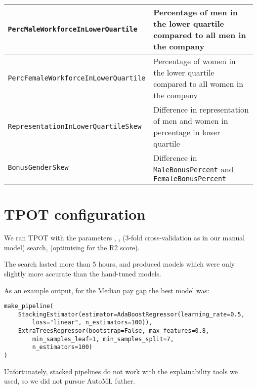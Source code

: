 \begin{centering}
{\begin{tabular}{|l|p{9cm}|}
        \texttt{PercMaleWorkforceInLowerQuartile} & Percentage of men in the lower quartile compared to all men in the company\\ \hline
        \texttt{PercFemaleWorkforceInLowerQuartile} & Percentage of women in the lower quartile compared to all women in the company\\ \hline
        \texttt{RepresentationInLowerQuartileSkew} & Difference in representation of men and women in percentage in lower quartile\\ \hline
        
        \texttt{BonusGenderSkew} & Difference in \texttt{MaleBonusPercent} and \texttt{FemaleBonusPercent} \\ \hline
        
    \end{tabular} 
    }

\end{centering}



\section{TPOT configuration}
\label{tpot-config}

We ran TPOT with the parameters 
,
, 
 (3-fold cross-validation as in our manual model)
search,
 (optimising for the R2 score).

The search lasted more than 5 hours, and produced models which were only slightly more accurate than the hand-tuned models.

As an example output, for the Median pay gap the best model was:

\begin{scriptsize}
\begin{verbatim}
make_pipeline(
    StackingEstimator(estimator=AdaBoostRegressor(learning_rate=0.5,
        loss="linear", n_estimators=100)),
    ExtraTreesRegressor(bootstrap=False, max_features=0.8, 
        min_samples_leaf=1, min_samples_split=7, 
        n_estimators=100)
)
\end{verbatim}
\end{scriptsize}

Unfortunately, stacked pipelines do not work with the explainability tools we used, so we did not pursue AutoML futher.


